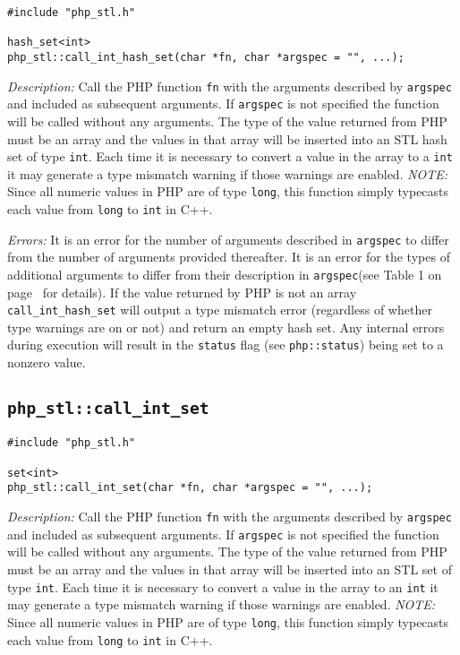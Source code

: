 \documentclass[11pt,titlepage]{article}
\begin{document}
\begin{verbatim}
#include "php_stl.h"

hash_set<int> 
php_stl::call_int_hash_set(char *fn, char *argspec = "", ...);
\end{verbatim}

\emph{Description:} Call the PHP function \verb|fn| with the arguments described by \verb|argspec| and included as subsequent arguments. If \verb|argspec| is not specified the function will be called without any arguments. The type of the value returned from PHP must be an array and the values in that array will be inserted into an STL hash set of type \verb|int|. Each time it is necessary to convert a value in the array to a \verb|int| it may generate a type mismatch warning if those warnings are enabled. \emph{NOTE:} Since all numeric values in PHP are of type \verb|long|, this function simply typecasts each value from \verb|long| to \verb|int| in C++.

\emph{Errors:} It is an error for the number of arguments described in \verb|argspec| to differ from the number of arguments provided thereafter. It is an error for the types of additional arguments to differ from their description in \verb|argspec|(see Table 1 on page~\pageref{Table1} for details). If the value returned by PHP is not an array \verb|call_int_hash_set| will output a type mismatch error (regardless of whether type warnings are on or not) and return an empty hash set. Any internal errors during execution will result in the \verb|status| flag (see \verb|php::status|) being set to a nonzero value.


\subsection{\texttt{php\_stl::call\_int\_set}}

\begin{verbatim}
#include "php_stl.h"

set<int> 
php_stl::call_int_set(char *fn, char *argspec = "", ...);
\end{verbatim}

\emph{Description:} Call the PHP function \verb|fn| with the arguments described by \verb|argspec| and included as subsequent arguments. If \verb|argspec| is not specified the function will be called without any arguments. The type of the value returned from PHP must be an array and the values in that array will be inserted into an STL set of type \verb|int|. Each time it is necessary to convert a value in the array to an \verb|int| it may generate a type mismatch warning if those warnings are enabled. \emph{NOTE:} Since all numeric values in PHP are of type \verb|long|, this function simply typecasts each value from \verb|long| to \verb|int| in C++.
\end{document}
